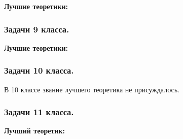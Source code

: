 \documentclass[12pt,a4paper,oneside]{scrartcl}
\newcounter{notask}
\newlength{\h}
\newlength{\x}
\begin{document}
\begin{center}
  \textbf{Лучшие теоретики:}
\end{center}

\begin{figure}[h]
  \centering
  \hspace{0.05\textwidth}
\end{figure}

\subsubsection{Задачи 9 класса.}
\label{sec:2-a-day_9}

\setcounter{notask}{1}
\vspace{1cm}

\begin{center}
  \textbf{Лучшие теоретики:}
\end{center}

\begin{figure}[h]
  \centering
  \hspace{0.05\textwidth}
  \hspace{0.05\textwidth}
\end{figure}


\subsubsection{Задачи 10 класса.}
\label{sec:2-a-day_10}

\setcounter{notask}{1}
\vspace{1cm}

В 10 классе звание лучшего теоретика не присуждалось. 

\subsubsection{Задачи 11 класса.}
\label{sec:2-a-day_11}

\setcounter{notask}{1}
\vspace{1cm}

\begin{center}
  \textbf{Лучший теоретик:}
\end{center}
\end{document}
